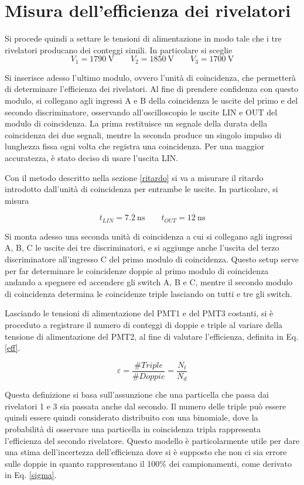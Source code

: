 \documentclass[10pt,a4paper]{article}
\begin{document}
\section{Misura dell'efficienza dei rivelatori}
Si procede quindi a settare le tensioni di alimentazione in modo tale che i tre rivelatori producano dei conteggi simili. In particolare si sceglie
\[ V_1=\SI{1790}{\volt} \quad\quad V_2=\SI{1850}{\volt} \quad\quad V_3=\SI{1700}{\volt} \]

Si inserisce adesso l'ultimo modulo, ovvero l'unità di coincidenza, che permetterà di determinare l'efficienza dei rivelatori. Al fine di prendere confidenza con questo modulo, si collegano agli ingressi A e B della coincidenza le uscite del primo e del secondo discriminatore, osservando all'oscilloscopio le uscite LIN e OUT del modulo di coincidenza. La prima restituisce un segnale della durata della coincidenza dei due segnali, mentre la seconda produce un singolo impulso di lunghezza fissa ogni volta che registra una coincidenza. Per una maggior accuratezza, è stato deciso di usare l'uscita LIN. %

Con il metodo descritto nella sezione \ref{ritardo} si va a misurare il ritardo introdotto dall'unità di coincidenza per entrambe le uscite. In particolare, si misura

\[t_{LIN}=\SI{7.2}{\nano \second} \qquad t_{OUT}=\SI{12}{\nano\second} \]

Si monta adesso una seconda unità di coincidenza a cui si collegano agli ingressi A, B, C le uscite dei tre discriminatori, e si aggiunge anche l'uscita del terzo discriminatore all'ingresso C del primo modulo di coincidenza. Questo setup serve per far determinare le coincidenze doppie al primo modulo di coincidenza andando a spegnere ed accendere gli switch A, B e C, mentre il secondo modulo di coincidenza determina le coincidenze triple lasciando on tutti e tre gli switch. 

Lasciando le tensioni di alimentazione del PMT1 e del PMT3 costanti, si è proceduto a registrare il numero di conteggi di doppie e triple al variare della tensione di alimentazione del PMT2, al fine di valutare l'efficienza, definita in Eq. \eqref{eff}.

\begin{equation}
    \varepsilon=\frac{\# Triple}{\# Doppie}=\frac{N_t}{N_d}\label{eff}
\end{equation}

Questa definizione si basa sull'assunzione che una particella che passa dai rivelatori 1 e 3 sia passata anche dal secondo. Il numero delle triple può essere quindi essere quindi considerato distribuito con una binomiale, dove la probabilità di osservare una particella in coincidenza tripla rappresenta l'efficienza del secondo rivelatore. Questo modello è particolarmente utile per dare una stima dell'incertezza dell'efficienza dove si è supposto che non ci sia errore sulle doppie in quanto rappresentano il 100\% dei campionamenti, come derivato in Eq. \eqref{sigma}.
\end{document}
